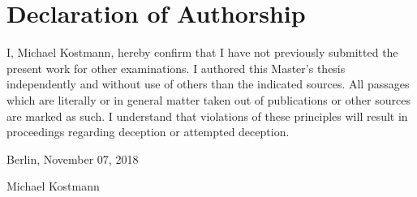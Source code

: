 
\section*{Declaration of Authorship}

I, Michael Kostmann, hereby confirm that I have not previously submitted the present work for other examinations. I authored this Master's thesis independently and without use of others than the indicated sources. All passages which are literally or in general matter taken out of publications or other sources are marked as such. I understand that violations of these principles will result in proceedings regarding deception or attempted deception.
\\\vspace{0.5cm}

\noindent Berlin, November 07, 2018 \\\vspace{0.1cm}

\noindent Michael Kostmann
